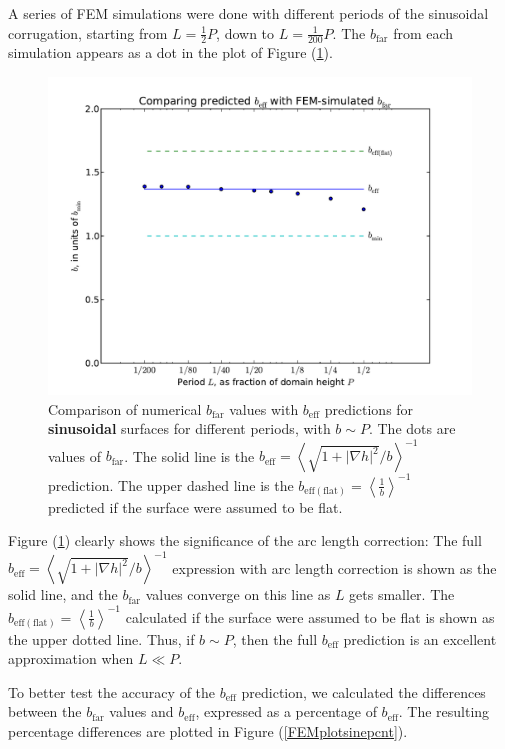 \documentclass[12pt, a4paper, twoside, openright]{book}
\newcommand{\beff}{\ensuremath{b_{\mathrm{eff}}}}
\newcommand{\bfar}{\ensuremath{b_{\mathrm{far}}}}
\newcommand{\beffhf}{\ensuremath{b_{\mathrm{eff (flat)}}} = \left< \frac{1}{b} \right>^{-1} }
\newcommand{\beffha}{\ensuremath{b_{\mathrm{eff}}} = \left< \sqrt{1 + |\nabla h|^2} / {b} \right>^{-1} }
\begin{document}
A series of FEM simulations were done with different periods of the sinusoidal corrugation, starting from $L = \frac{1}{2}P$, down to $L = \frac{1}{200}P$. The $\bfar$ from each simulation appears as a dot in the plot of Figure (\ref{FEMplotsine}).

\begin{figure}[ht]
\includegraphics[scale=0.595]{Lund_Thesis_FEM_plot_sine}
\caption{Comparison of numerical $\bfar$ values with $\beff$ predictions for \textbf{sinusoidal} surfaces for different periods, with $b\sim P$. The dots are values of $\bfar$. The solid line is the  $\beffha$ prediction.  The upper dashed line is the $\beffhf$ predicted if the surface were assumed to be flat.}\label{FEMplotsine}
\end{figure}

Figure (\ref{FEMplotsine}) clearly shows the significance of the arc length correction: The full $\beffha$ expression with arc length correction is shown as the solid line, and the $\bfar$ values converge on this line as $L$ gets smaller. The $\beffhf$ calculated if the surface were assumed to be flat is shown as the upper dotted line.  Thus, if $b\sim P$, then the full $\beff$ prediction is an excellent approximation when $L \ll P$.

To better test the accuracy of the $\beff$ prediction, we calculated the differences between the $\bfar$ values and $\beff$, expressed as a percentage of $\beff$.  The resulting percentage differences are plotted in Figure (\ref{FEMplotsinepcnt}). 
\end{document}
